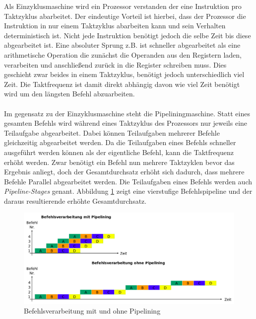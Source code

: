             Als Einzyklusmaschine wird ein Prozessor verstanden der eine Instruktion pro Taktzyklus abarbeitet.
            Der eindeutige Vorteil ist hierbei, dass der Prozessor die Instruktion in nur einem Taktzyklus
            abarbeiten kann und sein Verhalten deterministisch ist.
            Nicht jede Instruktion benötigt jedoch die selbe Zeit bis diese abgearbeitet ist.
            Eine absoluter Sprung z.B. ist schneller abgearbeitet als eine arithmetische
            Operation die zunächst die Operanden aus den Registern laden,
            verarbeiten und anschließend zurück in die Register schreiben muss.
            Dies geschieht zwar beides in einem Taktzyklus, benötigt jedoch unterschiedlich viel Zeit.
            Die Taktfrequenz ist damit direkt abhängig davon wie viel Zeit benötigt wird
            um den längsten Befehl abzuarbeiten.
            \\\\
            Im gegensatz zu der Einzyklusmaschine steht die Pipeliningmaschine.
            Statt eines gesamten Befehls wird während eines Taktzyklus des Prozessors nur jeweils eine Teilaufgabe abgearbeitet.
            Dabei können Teilaufgaben mehrerer Befehle gleichzeitig abgearbeitet werden.
            Da die Teilaufgaben eines Befehls schneller ausgeführt werden können als der eigentliche Befehl,
            kann die Taktfrequenz erhöht werden.
            Zwar benötigt ein Befehl nun mehrere Taktzyklen bevor das Ergebnis anliegt,
            doch der Gesamtdurchsatz erhöht sich dadurch, dass mehrere Befehle Parallel abgearbeitet werden.
            Die Teilaufgaben eines Befehls werden auch \textit{Pipeline-Stages} genant.
            Abbildung \ref{fig:pipelining} zeigt eine vierstufige Befehlspipeline und der daraus resultierende erhöhte Gesamtdurchsatz.

            \begin{figure}[H]
                \centering
                \includegraphics[scale=0.375]{img/pipelining.png}
                \caption[Befehlsverarbeitung mit und ohne Pipelining]{Befehlsverarbeitung mit und ohne Pipelining \cite{pipelining} }
                \label{fig:pipelining}
            \end{figure}

